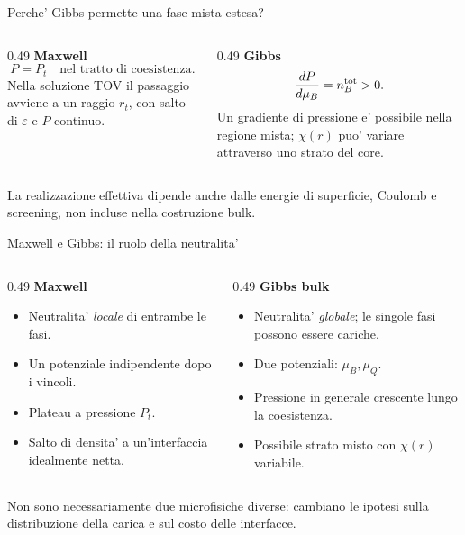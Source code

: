 \begin{frame}{Perche' Gibbs permette una fase mista estesa?}
\small
\begin{columns}[T,onlytextwidth]
\begin{column}{0.49\textwidth}
\textbf{Maxwell}
\[
P=P_t\quad\text{nel tratto di coesistenza}.
\]
Nella soluzione TOV il passaggio avviene a un raggio $r_t$,
con salto di $\varepsilon$ e $P$ continuo.
\end{column}
\begin{column}{0.49\textwidth}
\textbf{Gibbs}
\[
\frac{dP}{d\mu_B}=n_B^{\rm tot}>0.
\]
Un gradiente di pressione e' possibile
nella regione mista; $\chi(r)$ puo' variare
attraverso uno strato del core.
\end{column}
\end{columns}
\medskip
La realizzazione effettiva dipende anche dalle energie di superficie,
Coulomb e screening, non incluse nella costruzione bulk.
\end{frame}

\begin{frame}{Maxwell e Gibbs: il ruolo della neutralita'}
\small
\begin{columns}[T,onlytextwidth]
\begin{column}{0.49\textwidth}
\textbf{Maxwell}
\begin{itemize}
\item Neutralita' \emph{locale} di entrambe le fasi.
\item Un potenziale indipendente dopo i vincoli.
\item Plateau a pressione $P_t$.
\item Salto di densita' a un'interfaccia idealmente netta.
\end{itemize}
\end{column}
\begin{column}{0.49\textwidth}
\textbf{Gibbs bulk}
\begin{itemize}
\item Neutralita' \emph{globale}; le singole fasi possono essere cariche.
\item Due potenziali: $\mu_B,\mu_Q$.
\item Pressione in generale crescente lungo la coesistenza.
\item Possibile strato misto con $\chi(r)$ variabile.
\end{itemize}
\end{column}
\end{columns}
\medskip
Non sono necessariamente due microfisiche diverse: cambiano
le ipotesi sulla distribuzione della carica e sul costo delle interfacce.
\end{frame}

